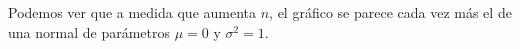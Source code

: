\documentclass[a4paper]{article}
\begin{document}
	\begin{figure}[H]
		\centering
		\hfill
	\end{figure}
	
	Podemos ver que a medida que aumenta $n$, el gr\'afico se parece cada vez m\'as el de una normal de par\'ametros $\mu = 0$ y $\sigma^2 = 1$. 

	
%	
\end{document}
